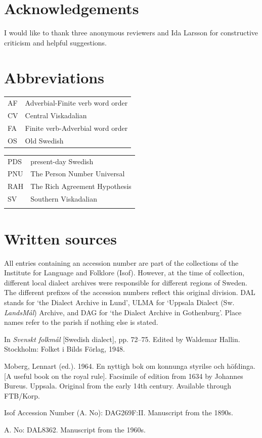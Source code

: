 \documentclass[output=paper,colorlinks,citecolor=brown,draft,draftmode]{langscibook}
\begin{document}
\section*{Acknowledgements}


I would like to thank three anonymous reviewers and Ida Larsson for constructive criticism and helpful suggestions.


\section*{Abbreviations}
\begin{tabularx}{.5\textwidth}{@{}lQ}
AF  &  Adverbial-Finite verb word order \\
CV  &  Central Viskadalian              \\
FA  &  Finite verb-Adverbial word order \\
OS  &  Old Swedish                      \\
\end{tabularx}%
\begin{tabularx}{.5\textwidth}{lQ@{}}
PDS  &  present-day Swedish               \\
PNU  &  The Person Number Universal       \\
RAH  &  The Rich Agreement Hypothesis     \\
SV   & Southern Viskadalian               \\
     & \\
\end{tabularx}

\section*{Written sources}
All entries containing an accession number are part of the collections of the Institute for Language and Folklore (Isof). However, at the time of collection, different local dialect archives were responsible for different regions of Sweden. The different prefixes of the accession numbers reflect this original division. DAL stands for ‘the Dialect Archive in Lund’, ULMA for ‘Uppsala Dialect (Sw. \textit{LandsMål}) Archive, and DAG for ‘the Dialect Archive in Gothenburg’. Place names refer to the parish if nothing else is stated.


\begin{description}[font=\normalfont]
\item[Himl:]   [Dialect texts from the hundred of Himle.] In \textit{Svenskt folkmål} [Swedish dialect], pp. 72–75. Edited by Waldemar Hallin. Stockholm: Folket i Bilds Förlag, 1948.
\item[K-styr:] Moberg, Lennart (ed.). 1964. En nyttigh bok om konnunga styrilse och höfdinga. [A useful book on the royal rule]. Facsimile of edition from 1634 by Johannes Bureus. Uppsala. Original from the early 14th century. Available through FTB/Korp.
\item[Fag:]    [Dialect texts from Fagered.] Isof Accession Number (A. No): DAG269F:II. Manuscript from the 1890s. 
\item[Värö1:]  [Dialect texts from Värö.] A. No: DAL8362. Manuscript from the 1960s. 
\end{description}
\end{document}
